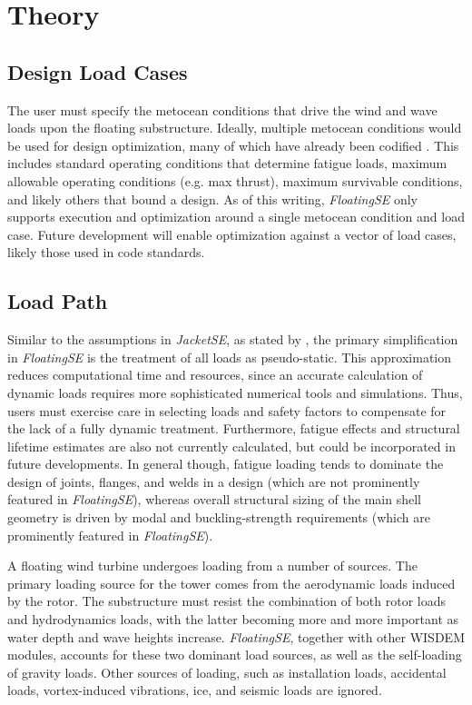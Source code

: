 \chapter{Theory}
\label{sec:theory}

\section{Design Load Cases}
The user must specify the metocean conditions that drive the wind and
wave loads upon the floating substructure.  Ideally, multiple metocean
conditions would be used for design optimization, many of which have
already been codified \citep{iec2009}.  This includes standard operating
conditions that determine fatigue loads, maximum allowable operating
conditions (e.g. max thrust), maximum survivable conditions, and likely
others that bound a design.  As of this writing, \textit{FloatingSE}
only supports execution and optimization around a single metocean
condition and load case.  Future development will enable optimization
against a vector of load cases, likely those used in code standards.

\section{Load Path}
Similar to the assumptions in \textit{JacketSE}, as stated by
\citep{JacketSE}, the primary simplification in \textit{FloatingSE} is
the treatment of all loads as pseudo-static. This approximation reduces
computational time and resources, since an accurate calculation of
dynamic loads requires more sophisticated numerical tools and
simulations.  Thus, users must exercise care in selecting loads and
safety factors to compensate for the lack of a fully dynamic treatment.
Furthermore, fatigue effects and structural lifetime estimates are also
not currently calculated, but could be incorporated in future
developments.  In general though, fatigue loading tends to dominate the
design of joints, flanges, and welds in a design (which are not
prominently featured in \textit{FloatingSE}), whereas overall structural
sizing of the main shell geometry is driven by modal and
buckling-strength requirements (which are prominently featured in
\textit{FloatingSE}).

A floating wind turbine undergoes loading from a number of sources.  The
primary loading source for the tower comes from the aerodynamic loads
induced by the rotor. The substructure must resist the combination of
both rotor loads and hydrodynamics loads, with the latter becoming more
and more important as water depth and wave heights increase.
\textit{FloatingSE}, together with other WISDEM modules, accounts for
these two dominant load sources, as well as the self-loading of gravity
loads.  Other sources of loading, such as installation loads, accidental
loads, vortex-induced vibrations, ice, and seismic loads are ignored.


